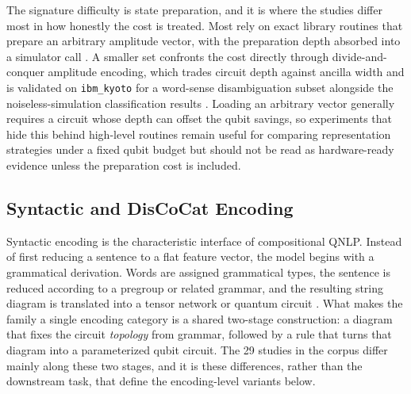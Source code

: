\documentclass{ieeeaccess}
\begin{document}
The signature difficulty is state preparation, and it is where the studies differ most in how honestly the cost is treated. Most rely on exact library routines that prepare an arbitrary amplitude vector, with the preparation depth absorbed into a simulator call \cite{buonaiuto_quantum_2024,guarasci_applying_2025}. A smaller set confronts the cost directly through divide-and-conquer amplitude encoding, which trades circuit depth against ancilla width and is validated on \texttt{ibm\_kyoto} for a word-sense disambiguation subset alongside the noiseless-simulation classification results \cite{zhang_entangled_2024}. Loading an arbitrary vector generally requires a circuit whose depth can offset the qubit savings, so experiments that hide this behind high-level routines remain useful for comparing representation strategies under a fixed qubit budget but should not be read as hardware-ready evidence unless the preparation cost is included.

\subsection{Syntactic and DisCoCat Encoding}
\label{subsec:syntactic_encoding}

Syntactic encoding is the characteristic interface of compositional QNLP. Instead of first reducing a sentence to a flat feature vector, the model begins with a grammatical derivation. Words are assigned grammatical types, the sentence is reduced according to a pregroup or related grammar, and the resulting string diagram is translated into a tensor network or quantum circuit \cite{coecke2010mathematical}. What makes the family a single encoding category is a shared two-stage construction: a diagram that fixes the circuit \emph{topology} from grammar, followed by a rule that turns that diagram into a parameterized qubit circuit. The 29 studies in the corpus differ mainly along these two stages, and it is these differences, rather than the downstream task, that define the encoding-level variants below.
\end{document}
